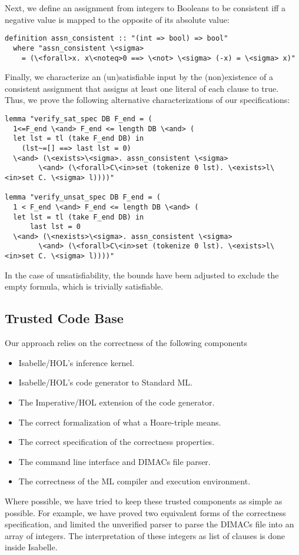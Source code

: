 \documentclass[conference]{IEEEtran}
\begin{document}
Next, we define an assignment from integers to Booleans to be consistent iff a negative value is mapped
to the opposite of its absolute value:
\begin{lstlisting}
definition assn_consistent :: "(int => bool) => bool"
  where "assn_consistent \<sigma>
    = (\<forall>x. x\<noteq>0 ==> \<not> \<sigma> (-x) = \<sigma> x)"
\end{lstlisting}
Finally, we characterize an (un)satisfiable input by the (non)existence of a consistent assignment that assigns at least one literal of each clause to true. Thus, we prove the following alternative characterizations of our specifications:
\begin{lstlisting}
lemma "verify_sat_spec DB F_end = (
  1<=F_end \<and> F_end <= length DB \<and> (
  let lst = tl (take F_end DB) in
    (lst~=[] ==> last lst = 0)
  \<and> (\<exists>\<sigma>. assn_consistent \<sigma>
        \<and> (\<forall>C\<in>set (tokenize 0 lst). \<exists>l\<in>set C. \<sigma> l))))"

lemma "verify_unsat_spec DB F_end = (
  1 < F_end \<and> F_end <= length DB \<and> (
  let lst = tl (take F_end DB) in
      last lst = 0
  \<and> (\<nexists>\<sigma>. assn_consistent \<sigma>
        \<and> (\<forall>C\<in>set (tokenize 0 lst). \<exists>l\<in>set C. \<sigma> l))))"
\end{lstlisting}
In the case of unsatisfiability, the bounds have been adjusted to exclude the empty formula, which is trivially satisfiable.


\subsection{Trusted Code Base}
Our approach relies on the correctness of the following components
\begin{itemize}
  \item Isabelle/HOL's inference kernel.
  \item Isabelle/HOL's code generator to Standard ML.
  \item The Imperative/HOL extension of the code generator.
  \item The correct formalization of what a Hoare-triple means.
  \item The correct specification of the correctness properties.
  \item The command line interface and DIMACs file parser.
  \item The correctness of the ML compiler and execution environment.
\end{itemize}

Where possible, we have tried to keep these trusted components as simple as possible.
For example, we have proved two equivalent forms of the correctness specification,
and limited the unverified parser to parse the DIMACs file into an array of integers.
The interpretation of these integers as list of clauses is done inside Isabelle.




\end{document}
